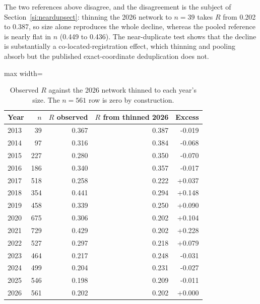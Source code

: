 \documentclass[fleqn,10pt]{wlpeerj}
\begin{document}
The two references above disagree, and the disagreement is the subject of
Section~\ref{si:neardupsect}: thinning the 2026 network to $n = 39$ takes $R$ from 0.202 to 0.387, so
size alone reproduces the whole decline, whereas the pooled reference is nearly flat in $n$
(0.449 to 0.436). The near-duplicate test shows that the decline is substantially a
co-located-registration effect, which thinning and pooling absorb but the published
exact-coordinate deduplication does not.

\begin{table}[H]
\centering
\caption{Observed $R$ against the 2026 network thinned to each year's size. The $n = 561$ row is zero by construction.}
\label{si:thin}
\small
\begin{adjustbox}{max width=\linewidth}
\begin{tabular}{lrrrr}
\toprule
Year & $n$ & $R$ observed & $R$ from thinned 2026 & Excess \\
\midrule
2013 & 39 & 0.367 & 0.387 & -0.019 \\
2014 & 97 & 0.316 & 0.384 & -0.068 \\
2015 & 227 & 0.280 & 0.350 & -0.070 \\
2016 & 186 & 0.340 & 0.357 & -0.017 \\
2017 & 518 & 0.258 & 0.222 & +0.037 \\
2018 & 354 & 0.441 & 0.294 & +0.148 \\
2019 & 458 & 0.339 & 0.250 & +0.090 \\
2020 & 675 & 0.306 & 0.202 & +0.104 \\
2021 & 729 & 0.429 & 0.202 & +0.228 \\
2022 & 527 & 0.297 & 0.218 & +0.079 \\
2023 & 464 & 0.217 & 0.248 & -0.031 \\
2024 & 499 & 0.204 & 0.231 & -0.027 \\
2025 & 546 & 0.198 & 0.209 & -0.011 \\
2026 & 561 & 0.202 & 0.202 & +0.000 \\
\bottomrule
\end{tabular}
\end{adjustbox}
\end{table}
\end{document}
